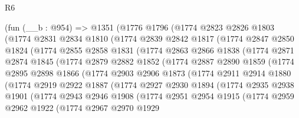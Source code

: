 \begin{lexlean}{R6}
\begin{coremodule}
    (fun (__b : @954) =>
    @1351
      (@1776
        @1796
        (@1774
          @2823
          @2826
          @1803
          (@1774
            @2831
            @2834
            @1810
            (@1774
              @2839
              @2842
              @1817
              (@1774
                @2847
                @2850
                @1824
                (@1774
                  @2855
                  @2858
                  @1831
                  (@1774
                    @2863
                    @2866
                    @1838
                    (@1774
                      @2871
                      @2874
                      @1845
                      (@1774
                        @2879
                        @2882
                        @1852
                        (@1774
                          @2887
                          @2890
                          @1859
                          (@1774
                            @2895
                            @2898
                            @1866
                            (@1774
                              @2903
                              @2906
                              @1873
                              (@1774
                                @2911
                                @2914
                                @1880
                                (@1774
                                  @2919
                                  @2922
                                  @1887
                                  (@1774
                                    @2927
                                    @2930
                                    @1894
                                    (@1774
                                      @2935
                                      @2938
                                      @1901
                                      (@1774
                                        @2943
                                        @2946
                                        @1908
                                        (@1774
                                          @2951
                                          @2954
                                          @1915
                                          (@1774
                                            @2959
                                            @2962
                                            @1922
                                            (@1774
                                              @2967
                                              @2970
                                              @1929

\end{coremodule}
\end{lexlean}
